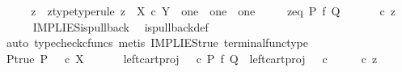 \begin{isabellebody}
%
\isadelimproof
%
\endisadelimproof
%
\isatagproof
{}\isamarkupfalse%
\ {\isacharminus}{\kern0pt}\isanewline
\ \ \isamarkupfalse%
\ z\ \ z{\isacharunderscore}{\kern0pt}type{\isacharbrackleft}{\kern0pt}type{\isacharunderscore}{\kern0pt}rule{\isacharbrackright}{\kern0pt}{\isacharcolon}{\kern0pt}\ {\isachardoublequoteopen}z\ {\isacharcolon}{\kern0pt}\ X\ {\isasymtimes}\isactrlsub c\ Y\ {\isasymrightarrow}\ one\ {\isasymCoprod}\ one\ {\isasymCoprod}\ one{\isachardoublequoteclose}\isanewline
\ \ \ \ \ z{\isacharunderscore}{\kern0pt}eq{\isacharcolon}{\kern0pt}\ {\isachardoublequoteopen}{\isacharparenleft}{\kern0pt}P\ {\isasymtimes}\isactrlsub f\ Q{\isacharparenright}{\kern0pt}\ {\isacharequal}{\kern0pt}\ {\isacharparenleft}{\kern0pt}{\isasymlangle}{\isasymt}{\isacharcomma}{\kern0pt}{\isasymt}{\isasymrangle}\ {\isasymamalg}\ {\isasymlangle}{\isasymf}{\isacharcomma}{\kern0pt}{\isasymf}{\isasymrangle}\ {\isasymamalg}\ {\isasymlangle}{\isasymf}{\isacharcomma}{\kern0pt}{\isasymt}{\isasymrangle}{\isacharparenright}{\kern0pt}\ {\isasymcirc}\isactrlsub c\ z{\isachardoublequoteclose}\isanewline
\ \ \ \ \isamarkupfalse%
\ IMPLIES{\isacharunderscore}{\kern0pt}is{\isacharunderscore}{\kern0pt}pullback\ \isamarkupfalse%
\ is{\isacharunderscore}{\kern0pt}pullback{\isacharunderscore}{\kern0pt}def\isanewline
\ \ \ \ \isamarkupfalse%
\ {\isacharparenleft}{\kern0pt}auto{\isacharcomma}{\kern0pt}\ typecheck{\isacharunderscore}{\kern0pt}cfuncs{\isacharcomma}{\kern0pt}\ metis\ IMPLIES{\isacharunderscore}{\kern0pt}true\ terminal{\isacharunderscore}{\kern0pt}func{\isacharunderscore}{\kern0pt}type{\isacharparenright}{\kern0pt}\ \ \isanewline
\ \ \isamarkupfalse%
\ P{\isacharunderscore}{\kern0pt}true{\isacharcolon}{\kern0pt}\ {\isachardoublequoteopen}P\ {\isacharequal}{\kern0pt}\ {\isasymt}\ {\isasymcirc}\isactrlsub c\ {\isasymbeta}\isactrlbsub X\isactrlesub {\isachardoublequoteclose}\isanewline
\ \ \isanewline
\ \ \isamarkupfalse%
\ {\isachardoublequoteopen}left{\isacharunderscore}{\kern0pt}cart{\isacharunderscore}{\kern0pt}proj\ {\isasymOmega}\ {\isasymOmega}\ {\isasymcirc}\isactrlsub c\ {\isacharparenleft}{\kern0pt}P\ {\isasymtimes}\isactrlsub f\ Q{\isacharparenright}{\kern0pt}\ {\isacharequal}{\kern0pt}\ left{\isacharunderscore}{\kern0pt}cart{\isacharunderscore}{\kern0pt}proj\ {\isasymOmega}\ {\isasymOmega}\ {\isasymcirc}\isactrlsub c\ {\isacharparenleft}{\kern0pt}{\isasymlangle}{\isasymt}{\isacharcomma}{\kern0pt}{\isasymt}{\isasymrangle}\ {\isasymamalg}\ {\isasymlangle}{\isasymf}{\isacharcomma}{\kern0pt}{\isasymf}{\isasymrangle}\ {\isasymamalg}\ {\isasymlangle}{\isasymf}{\isacharcomma}{\kern0pt}{\isasymt}{\isasymrangle}{\isacharparenright}{\kern0pt}\ {\isasymcirc}\isactrlsub c\ z{\isachardoublequoteclose}\isanewline

\end{isabellebody}
